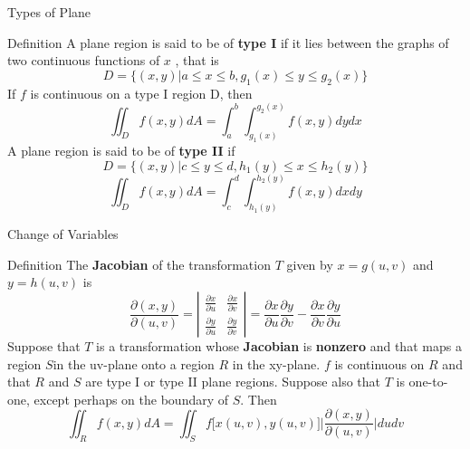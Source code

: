 \documentclass[aspectratio=169, UTF8]{ctexbeamer}
\begin{document}
\begin{frame}{Types of Plane}
    \begin{block}{Definition}
        A plane region is said to be of \textbf{type I} if it lies between the graphs of two continuous functions of $x$ , that is
        \begin{equation*}
            D=\{(x,y)|a\leq x\leq b, g_1(x)\leq y\leq g_2(x)\}
        \end{equation*}
        If $f$ is continuous on a type I region D, then
        \begin{equation*}
            \iint_Df(x,y)dA=\int_a^b\int_{g_1(x)}^{g_2(x)}f(x,y)dydx
        \end{equation*}
        A plane region is said to be of \textbf{type II} if
        \begin{equation*}
            D=\{(x,y)|c\leq y\leq d, h_1(y)\leq x\leq h_2(y)\}
        \end{equation*}
        \begin{equation*}
            \iint_Df(x,y)dA=\int_c^d\int_{h_1(y)}^{h_2(y)}f(x,y)dxdy
        \end{equation*}
    \end{block}
\end{frame}
\begin{frame}{Change of Variables}
    \begin{block}{Definition}
        The \textbf{Jacobian} of the transformation $T$ given by $x=g(u,v)$ and $y=h(u,v)$ is 
        \begin{equation*}
            \dfrac{\partial(x,y)}{\partial(u,v)}=
            \left|\begin{array}{cc}
                \frac{\partial x}{\partial u} & \frac{\partial x}{\partial v} \\
                \frac{\partial y}{\partial u} & \frac{\partial y}{\partial v}
            \end{array}\right|
            =\frac{\partial x}{\partial u}\frac{\partial y}{\partial v}-\frac{\partial x}{\partial v}\frac{\partial y}{\partial u}
        \end{equation*}
        Suppose that $T$ is a transformation whose \textbf{Jacobian} is \textbf{nonzero} and that maps a region $S$in the uv-plane onto a region $R$ in the xy-plane. $f$ is continuous on $R$ and that $R$ and $S$ are type I or type II plane regions. Suppose also that $T$ is one-to-one, except perhaps on the
boundary of $S$. Then
        \begin{equation*}
            \iint_Rf(x,y)dA=\iint_Sf\big[x(u,v),y(u,v)\big]\Big| \dfrac{\partial(x,y)}{\partial(u,v)}\Big|dudv
        \end{equation*}
    \end{block}
\end{frame}
\end{document}
